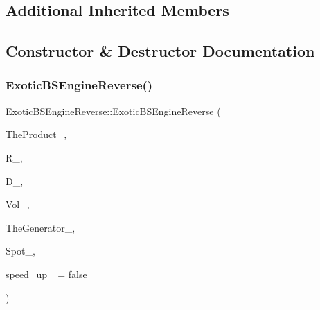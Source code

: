 \subsection*{Additional Inherited Members}


\subsection{Constructor \& Destructor Documentation}
\hypertarget{classExoticBSEngineReverse_ad8068252390378408d6baa71d4c0049a}{}\label{classExoticBSEngineReverse_ad8068252390378408d6baa71d4c0049a} 
\subsubsection{\texorpdfstring{Exotic\+B\+S\+Engine\+Reverse()}{ExoticBSEngineReverse()}}
{\footnotesize\ttfamily Exotic\+B\+S\+Engine\+Reverse\+::\+Exotic\+B\+S\+Engine\+Reverse (\begin{DoxyParamCaption}\item[{const \hyperlink{classWrapper}{Wrapper}$<$ \hyperlink{classPathDependent}{Path\+Dependent} $>$ \&}]{The\+Product\+\_\+,  }\item[{const \hyperlink{classParameters}{Parameters} \&}]{R\+\_\+,  }\item[{const \hyperlink{classParameters}{Parameters} \&}]{D\+\_\+,  }\item[{const \hyperlink{classParameters}{Parameters} \&}]{Vol\+\_\+,  }\item[{const \hyperlink{classWrapper}{Wrapper}$<$ \hyperlink{classRandomBase}{Random\+Base} $>$ \&}]{The\+Generator\+\_\+,  }\item[{double}]{Spot\+\_\+,  }\item[{bool}]{speed\+\_\+up\+\_\+ = {\ttfamily false} }\end{DoxyParamCaption})}

\hypertarget{classExoticBSEngineReverse_af436a230e87f2b0fc2b4508010e8eb49}{}\label{classExoticBSEngineReverse_af436a230e87f2b0fc2b4508010e8eb49} 
